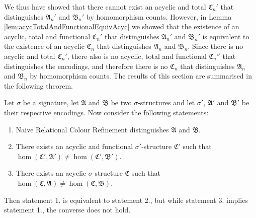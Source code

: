 We thus have showed that there cannot exist an acyclic and total $\mathfrak C_n'$ that distinguishes $\mathfrak A_n'$ and $\mathfrak B_n'$ by homomorphism counts.
However, in Lemma \ref{lem:acycTotalAndFunctionalEquivAcyc} we showed that the existence of an acyclic, total and functional $\mathfrak C_n'$ that distinguishes $\mathfrak A_n'$ and $\mathfrak B_n'$ is equivalent to the existence of an acyclic $\mathfrak C_n$ that distinguishes $\mathfrak A_n$ and $\mathfrak B_n$.
Since there is no acyclic and total $\mathfrak C_n'$, there also is no acyclic, total and functional $\mathfrak C_n''$ that distinguishes the encodings, and therefore there is no $\mathfrak C_n$ that distinguishes $\mathfrak A_n$ and $\mathfrak B_n$ by homomorphism counts.
The results of this section are summarised in the following theorem.

\begin{theorem}
	Let $\sigma$ be a signature, let $\mathfrak A$ and $\mathfrak B$ be two $\sigma$-structures and let $\sigma'$, $\mathfrak A'$ and $\mathfrak B'$ be their respective encodings.
	Now consider the following statements:
	\begin{enumerate}
		\item Naive Relational Colour Refinement distinguishes $\mathfrak A$ and $\mathfrak B$.
		\item There exists an acyclic and functional $\sigma'$-structure $\mathfrak C'$ such that $\hom(\mathfrak C',\mathfrak A')\neq\hom(\mathfrak C',\mathfrak B')$.
		\item There exists an acyclic $\sigma$-structure $\mathfrak C$ such that $\hom(\mathfrak C,\mathfrak A)\neq \hom(\mathfrak C,\mathfrak B)$.
	\end{enumerate}
	Then statement 1. is equivalent to statement 2., but while statement 3. implies statement 1., the converse does not hold.
	\label{thm:nRCRNotCharacByHomCount}
\end{theorem}
